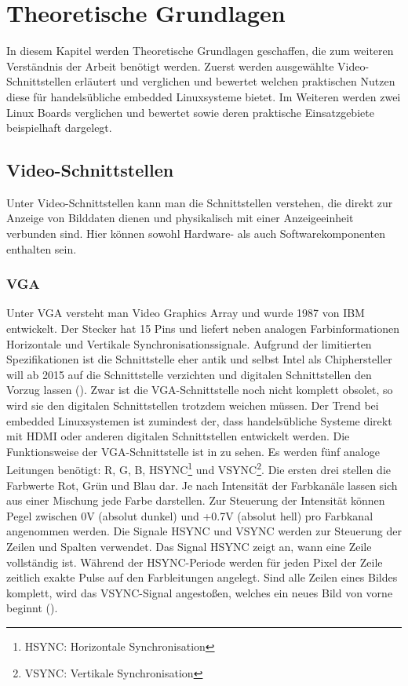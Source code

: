 \chapter{Theoretische Grundlagen}
\label{cha:Grundlagen}
In diesem Kapitel werden Theoretische Grundlagen geschaffen, die zum weiteren Verständnis der Arbeit benötigt werden. Zuerst werden ausgewählte Video-Schnittstellen erläutert und verglichen und bewertet welchen praktischen Nutzen diese für handelsübliche embedded Linuxsysteme bietet. Im Weiteren werden zwei Linux Boards verglichen und bewertet sowie deren praktische Einsatzgebiete beispielhaft dargelegt.

\section{Video-Schnittstellen}
Unter Video-Schnittstellen kann man die Schnittstellen verstehen, die direkt zur Anzeige von Bilddaten dienen und physikalisch mit einer Anzeigeeinheit verbunden sind. Hier können sowohl Hardware- als auch Softwarekomponenten enthalten sein.
\subsection{VGA}
Unter VGA versteht man Video Graphics Array und wurde 1987 von IBM entwickelt. Der Stecker hat 15 Pins und liefert neben analogen Farbinformationen Horizontale und Vertikale Synchronisationssignale. Aufgrund der limitierten Spezifikationen ist die Schnittstelle eher antik und selbst Intel als Chiphersteller will ab 2015 auf die Schnittstelle verzichten  und digitalen Schnittstellen den Vorzug lassen (\cite{Intel2010}). Zwar ist die VGA-Schnittstelle noch nicht komplett obsolet, so wird sie den digitalen Schnittstellen trotzdem weichen müssen. Der Trend bei embedded Linuxsystemen ist zumindest der, dass handelsübliche Systeme direkt mit HDMI oder anderen digitalen Schnittstellen entwickelt werden.
Die Funktionsweise der VGA-Schnittstelle ist in  zu sehen. Es werden fünf analoge Leitungen benötigt: R, G, B, HSYNC\footnote{HSYNC: Horizontale Synchronisation} und VSYNC\footnote{VSYNC: Vertikale Synchronisation}. Die ersten drei stellen die Farbwerte Rot, Grün und Blau dar. Je nach Intensität der Farbkanäle lassen sich aus einer Mischung jede Farbe darstellen. Zur Steuerung der Intensität können Pegel zwischen 0V (absolut dunkel) und +0.7V (absolut hell) pro Farbkanal angenommen werden. Die Signale HSYNC und VSYNC werden zur Steuerung der Zeilen und Spalten verwendet. Das Signal HSYNC zeigt an, wann eine Zeile vollständig ist. Während der HSYNC-Periode werden für jeden Pixel der Zeile zeitlich exakte Pulse auf den Farbleitungen angelegt. Sind alle Zeilen eines Bildes komplett, wird das VSYNC-Signal angestoßen, welches ein neues Bild von vorne beginnt (\cite{Valcarce2011}).

